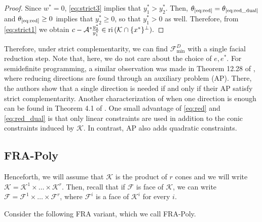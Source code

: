 \documentclass{article}
\newcommand{\reInt}{\mathrm{ri}\,}
\newcommand{\inProd}[2]{\langle #1 , #2 \rangle }
\newcommand{\minFaceD}{ {\mathcal{F}_{\min}^D}}
\newcommand{\stdMap}{ {\mathcal{A}}}
\newcommand{\stdCone}{ {\mathcal{K}}}
\newcommand{\stdFace}{ \mathcal{F}}
\newcommand{\stdInt}{ {e}}
\newcommand{\opt}[1]{ {\theta _{#1}}}
\newcommand{\T}{\ast\hspace{-1pt}}
\begin{document}
\begin{proof}
Since $w^* = 0$, \eqref{eq:strict3} implies that $y_1^* > y_2^*$. Then, $\opt{\text{\ref{eq:red}}} = \opt{\text{\ref{eq:red_dual}}} $ and 
$\opt{\text{\ref{eq:red}}} \geq 0 $ implies that $y_2^* \geq 0$, so that $y_1^* > 0$ as well.
Therefore, from \eqref{eq:strict1} we obtain $c -\stdMap^\T \frac{y_3^*}{y_1^*} \in \reInt (\stdCone \cap\{ x^*\}^\perp).$
\end{proof}

Therefore, under strict complementarity, we can find $\minFaceD$ with a single facial reduction step.
Note that, here, we do not care about the choice of $\stdInt,\stdInt^*$.
For semidefinite programming, a similar observation was made in Theorem 12.28 of \cite{csw13}, where reducing directions are found through an 
auxiliary problem (AP). There, the authors show that a single direction is needed if and only if their AP satisfy strict complementarity. Another characterization of when one direction is enough can be found in Theorem 4.1 of \cite{DPW15}. One small advantage of \eqref{eq:red} and \eqref{eq:red_dual}  is that only linear constraints are used in addition to the conic constraints induced by $\stdCone$. In contrast, AP also adds quadratic constraints.




\subsection{FRA-Poly}

Henceforth, we will assume that $\stdCone$ is the product of $r$ cones and we will 
write $\stdCone = \stdCone ^1 \times \ldots \times \stdCone  ^r $. Then, recall that 
if $\stdFace$ is face of $\stdCone$, we can write $\stdFace = \stdFace ^1 \times \ldots \times \stdFace  ^r$, where $\stdFace ^i$ is a face of $\stdCone ^i$ for every $i$.

Consider the following 
FRA variant, which we call FRA-Poly.

\end{document}
